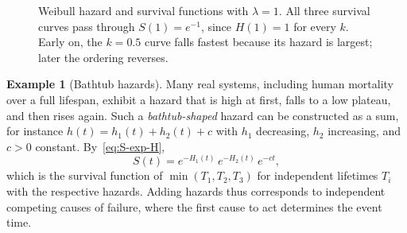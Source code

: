 \documentclass[11pt]{article}
\theoremstyle{definition}
\newtheorem{example}[definition]{Example}
\theoremstyle{plain}
\begin{document}
\begin{figure}[ht]
\centering
\begin{minipage}{0.48\textwidth}
\centering
{}
\end{minipage}\hfill
\begin{minipage}{0.48\textwidth}
\centering
{}
\end{minipage}
\caption{Weibull hazard and survival functions with $\lambda = 1$. All three survival curves pass through $S(1) = e^{-1}$, since $H(1) = 1$ for every $k$. Early on, the $k=0.5$ curve falls fastest because its hazard is largest; later the ordering reverses.}
\label{fig:weibull}
\end{figure}

\begin{example}[Bathtub hazards]
Many real systems, including human mortality over a full lifespan, exhibit a hazard that is high at first, falls to a low plateau, and then rises again. Such a \emph{bathtub-shaped} hazard can be constructed as a sum, for instance $h(t) = h_1(t) + h_2(t) + c$ with $h_1$ decreasing, $h_2$ increasing, and $c > 0$ constant. By~\eqref{eq:S-exp-H},
\[
  S(t) = e^{-H_1(t)}\,e^{-H_2(t)}\,e^{-ct},
\]
which is the survival function of $\min(T_1, T_2, T_3)$ for independent lifetimes $T_i$ with the respective hazards. Adding hazards thus corresponds to independent competing causes of failure, where the first cause to act determines the event time.
\end{example}
\end{document}
